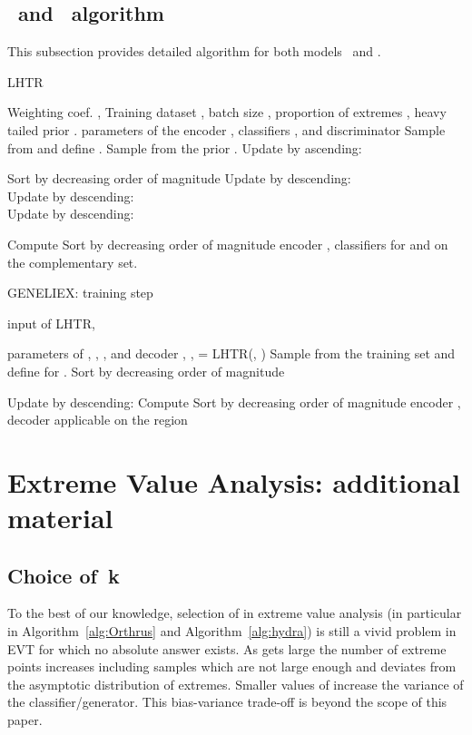 \subsection{\HTalgo\ and \geneliex\ algorithm}\label{sec:code} This subsection provides detailed algorithm for both models \HTalgo\ and \geneliex.
\begin{algorithm}[t]
\caption{LHTR}
\begin{algorithmic}\INPUT  Weighting coef. , Training dataset , batch size , proportion of extremes , heavy tailed prior . 
\Initialize parameters  of the encoder , classifiers ,  and  discriminator 
\Optimization
{}
\Statex Sample  from  
and define . 
\Statex Sample  from the prior .
\Statex Update  by ascending:\\\Statex 
 
\Statex Sort  by decreasing order of magnitude 
\Statex Update  by descending:\\\Statex 
\Statex Update  by descending:\\\Statex
\Statex
\Statex Update  by descending: 
\Statex

\EndWhile
\Statex Compute 
\Statex Sort  by decreasing order of magnitude 
\OUTPUT encoder , classifiers  for  and  on the complementary set.
\end{algorithmic}
\label{alg:Orthrus}
\end{algorithm} \begin{algorithm}[H]
\caption{GENELIEX: training step}
\begin{algorithmic}\INPUT 
input of LHTR, 

\Initialize parameters of , , ,  and decoder  \Optimization  \Statex  , ,  = LHTR(, )
\Statex Sample  from the training set  and define
 for .
\Statex Sort  by decreasing order of magnitude

\Statex Update  by descending:
\EndWhile
\Statex Compute 
\Statex Sort  by decreasing order of magnitude 
\OUTPUT encoder , decoder  applicable on the region  
\end{algorithmic}
\label{alg:hydra}
\end{algorithm}
%
 

\section{Extreme Value Analysis: additional material}
\label{sec:classif-supplem}

\subsection{Choice of~k}  
To the best of our knowledge, selection of   in extreme value analysis (in particular in  Algorithm~\ref{alg:Orthrus} and Algorithm~\ref{alg:hydra}) is still a vivid problem in EVT for which no absolute answer exists. As  gets large the number of extreme points increases including samples which are not large enough and deviates from the asymptotic distribution of extremes. Smaller values of  increase the variance of the classifier/generator. This bias-variance trade-off is beyond the scope of this paper.

